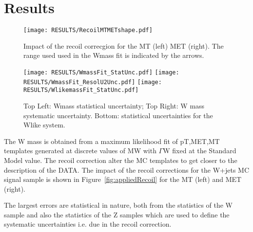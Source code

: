 \chapter{Results}

{\color{magenta}{HERE SLIDES:7,9,10,11,30}}

\begin{figure}[h!]
  \begin{center}
    \texttt{[image: RESULTS/RecoilMTMETshape.pdf]}
    \caption{
      Impact of the recoil correcgion for the MT (left) MET (right).
      The range used used in the Wmass fit is indicated by the arrows.
    }
    \label{fig:appliedRecoil}
  \end{center}
  \begin{center}
    \texttt{[image: RESULTS/WmassFit\_StatUnc.pdf]}
    \texttt{[image: RESULTS/WmassFit\_ResolU2Unc.pdf]}
    \texttt{[image: RESULTS/WlikemassFit\_StatUnc.pdf]}
    \caption{
      Top Left: Wmass statistical uncertainty; Top Right: W mass systematic uncertainty.
      Bottom: statistical uncertainties for the Wlike system.
    }
    \label{fig:resultsFit}
  \end{center}
\end{figure}

The W mass is obtained from a maximum likelihood fit of pT,MET,MT templates generated at discrete values of MW with $\Gamma$W fixed at the Standard Model value. The recoil correction alter the MC templates to get closer to the description of the DATA.
The impact of the recoil corrections for the W+jets MC signal sample is shown in Figure~\ref{fig:appliedRecoil} for the MT (left) and MET (right).

The largest errors are statistical in nature, both from the statistics of the W sample and also the statistics of the Z samples which are used to define the systematic uncertainties i.e. due in the recoil correction.


